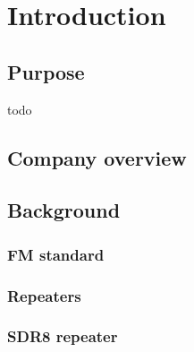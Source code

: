 \chapter{Introduction}
\section{Purpose}
todo

\section{Company overview}


\section{Background}

\subsection{FM standard}
\subsection{Repeaters}
\subsection{SDR8 repeater}

